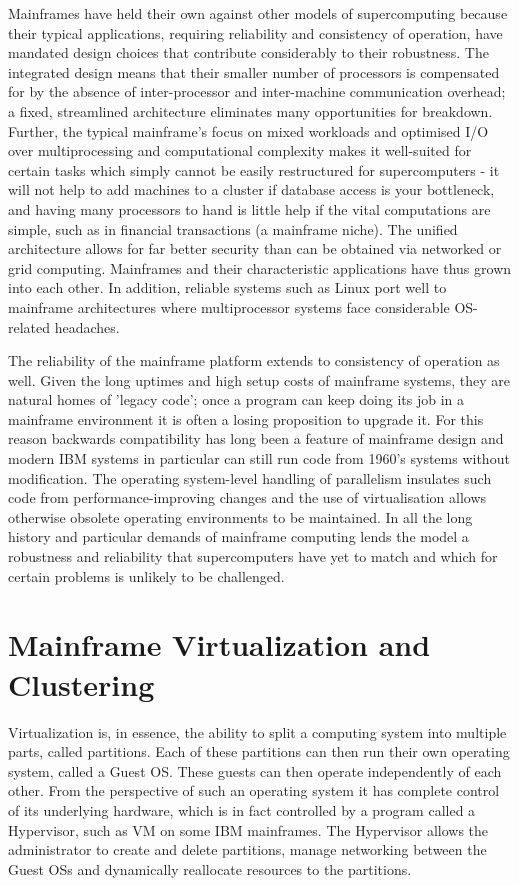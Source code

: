\documentclass[a4paper,12pt]{article}
\begin{document}
Mainframes have held their own against other models of supercomputing because
their typical applications, requiring reliability and consistency of operation,
have mandated design choices that contribute considerably to their robustness.
The integrated design means that their smaller number of processors is
compensated for by the absence of inter-processor and inter-machine
communication overhead; a fixed, streamlined architecture eliminates many
opportunities for breakdown. Further, the typical mainframe's focus on mixed
workloads and optimised I/O over multiprocessing and computational complexity
makes it well-suited for certain tasks which simply cannot be easily
restructured for supercomputers - it will not help to add machines to a cluster
if database access is your bottleneck, and having many processors to hand is
little help if the vital computations are simple, such as in financial
transactions (a mainframe niche). The unified architecture allows for far
better security than can be obtained via networked or grid computing.
Mainframes and their characteristic applications have thus grown into each
other. In addition, reliable systems such as Linux port well to mainframe
architectures where multiprocessor systems face considerable OS-related
headaches.

The reliability of the mainframe platform extends to consistency of operation
as well. Given the long uptimes and high setup costs of mainframe systems, they
are natural homes of 'legacy code'; once a program can keep doing its job in a
mainframe environment it is often a losing proposition to upgrade it. For this
reason backwards compatibility has long been a feature of mainframe design and
modern IBM systems in particular can still run code from 1960's systems without
modification. The operating system-level handling of parallelism insulates such
code from performance-improving changes and the use of virtualisation allows
otherwise obsolete operating environments to be maintained. In all the long
history and particular demands of mainframe computing lends the model a
robustness and reliability that supercomputers have yet to match and which for
certain problems is unlikely to be challenged.

\section{Mainframe Virtualization and Clustering}

Virtualization is, in essence, the ability to split a computing system into
multiple parts, called partitions. Each of these partitions can then run their
own operating system, called a Guest OS. These guests can then operate
independently of each other\cite{m4}. From the perspective of such an operating
system it has complete control of its underlying hardware, which is in fact
controlled by a program called a Hypervisor, such as VM on some IBM
mainframes\cite{m2}. The Hypervisor allows the administrator to create and delete
partitions, manage networking between the Guest OSs and dynamically reallocate
resources to the partitions. 
\end{document}
